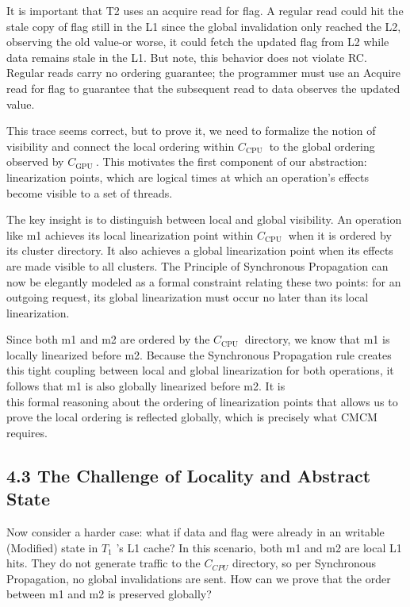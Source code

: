 \documentclass[10pt]{article}
\begin{document}
It is important that T2 uses an acquire read for flag. A regular read could hit the stale copy of flag still in the L1 since the global invalidation only reached the L2, observing the old value-or worse, it could fetch the updated flag from L2 while data remains stale in the L1. But note, this behavior does not violate RC. Regular reads carry no ordering guarantee; the programmer must use an Acquire read for flag to guarantee that the subsequent read to data observes the updated value.

This trace seems correct, but to prove it, we need to formalize the notion of visibility and connect the local ordering within $C_{\text {CPU }}$ to the global ordering observed by $C_{\text {GPU }}$. This motivates the first component of our abstraction: linearization points, which are logical times at which an operation's effects become visible to a set of threads.

The key insight is to distinguish between local and global visibility. An operation like m1 achieves its local linearization point within $C_{\text {CPU }}$ when it is ordered by its cluster directory. It also achieves a global linearization point when its effects are made visible to all clusters. The Principle of Synchronous Propagation can now be elegantly modeled as a formal constraint relating these two points: for an outgoing request, its global linearization must occur no later than its local linearization.

Since both m1 and m2 are ordered by the $C_{\text {CPU }}$ directory, we know that m1 is locally linearized before m2. Because the Synchronous Propagation rule creates this tight coupling between local and global linearization for both operations, it follows that m1 is also globally linearized before m2. It is\\
this formal reasoning about the ordering of linearization points that allows us to prove the local ordering is reflected globally, which is precisely what CMCM requires.

\subsection*{4.3 The Challenge of Locality and Abstract State}
Now consider a harder case: what if data and flag were already in an writable (Modified) state in $T_{1}$ 's L1 cache? In this scenario, both m1 and m2 are local L1 hits. They do not generate traffic to the $C_{C P U}$ directory, so per Synchronous Propagation, no global invalidations are sent. How can we prove that the order between m1 and m2 is preserved globally?
\end{document}
